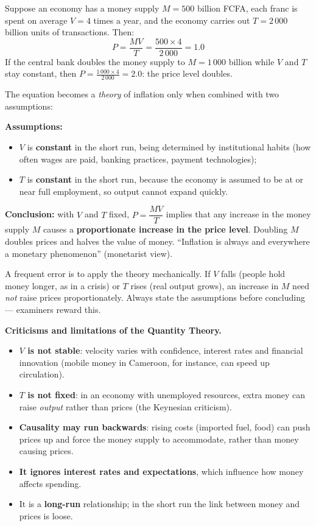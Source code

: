 \documentclass[11pt]{article}
\begin{document}
\begin{exemplebox}[A numerical illustration of $MV = PT$]
Suppose an economy has a money supply $M = 500$ billion FCFA, each franc is spent on average $V = 4$ times a year, and the economy carries out $T = 2\,000$ billion units of transactions. Then:
\[
P = \frac{MV}{T} = \frac{500 \times 4}{2\,000} = 1.0
\]
If the central bank doubles the money supply to $M = 1\,000$ billion while $V$ and $T$ stay constant, then $P = \frac{1\,000 \times 4}{2\,000} = 2.0$: the price level doubles.
\end{exemplebox}

The equation becomes a \emph{theory} of inflation only when combined with two assumptions:

\begin{propriete}
\textbf{Assumptions:}
\begin{itemize}
\item $V$ is \textbf{constant} in the short run, being determined by institutional habits (how often wages are paid, banking practices, payment technologies);
\item $T$ is \textbf{constant} in the short run, because the economy is assumed to be at or near full employment, so output cannot expand quickly.
\end{itemize}
\textbf{Conclusion:} with $V$ and $T$ fixed, $P = \dfrac{MV}{T}$ implies that any increase in the money supply $M$ causes a \textbf{proportionate increase in the price level}. Doubling $M$ doubles prices and halves the value of money. ``Inflation is always and everywhere a monetary phenomenon'' (monetarist view).
\end{propriete}

\begin{attention}
A frequent error is to apply the theory mechanically. If $V$ falls (people hold money longer, as in a crisis) or $T$ rises (real output grows), an increase in $M$ need \emph{not} raise prices proportionately. Always state the assumptions before concluding --- examiners reward this.
\end{attention}

\textbf{Criticisms and limitations of the Quantity Theory.}
\begin{itemize}
\item \textbf{$V$ is not stable}: velocity varies with confidence, interest rates and financial innovation (mobile money in Cameroon, for instance, can speed up circulation).
\item \textbf{$T$ is not fixed}: in an economy with unemployed resources, extra money can raise \emph{output} rather than prices (the Keynesian criticism).
\item \textbf{Causality may run backwards}: rising costs (imported fuel, food) can push prices up and force the money supply to accommodate, rather than money causing prices.
\item \textbf{It ignores interest rates and expectations}, which influence how money affects spending.
\item It is a \textbf{long-run} relationship; in the short run the link between money and prices is loose.
\end{itemize}
\end{document}
